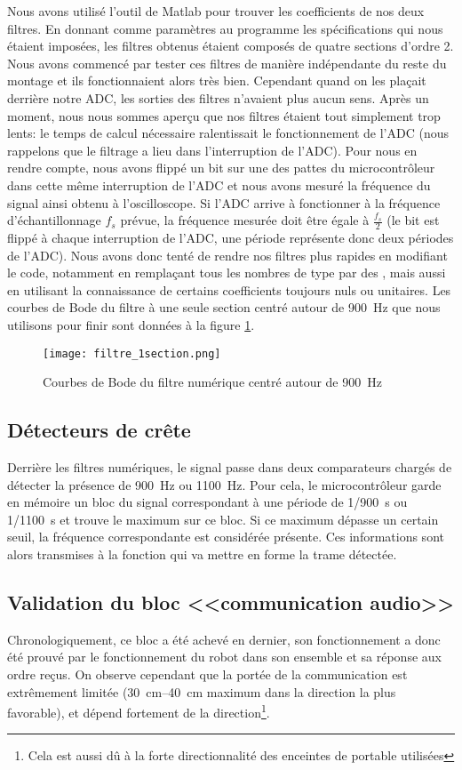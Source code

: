 Nous avons utilisé l'outil  de Matlab pour trouver les coefficients de nos deux filtres. En donnant comme paramètres au programme les spécifications qui nous étaient imposées, les filtres obtenus étaient composés de quatre sections d'ordre 2. Nous avons commencé par tester ces filtres de manière indépendante du reste du montage et ils fonctionnaient alors très bien. Cependant quand on les plaçait derrière notre ADC, les sorties des filtres n'avaient plus aucun sens. Après un moment, nous nous sommes aperçu que nos filtres étaient tout simplement trop lents: le temps de calcul nécessaire ralentissait le fonctionnement de l'ADC (nous rappelons que le filtrage a lieu dans l'interruption de l'ADC). Pour nous en rendre compte, nous avons flippé un bit sur une des pattes du microcontrôleur dans cette même interruption de l'ADC et nous avons mesuré la fréquence du signal ainsi obtenu à l'oscilloscope. Si l'ADC arrive à fonctionner à la fréquence d'échantillonnage $f_s$  prévue, la fréquence mesurée doit être égale à $\frac{f_s}{2}$ (le bit est flippé à chaque interruption de l'ADC, une période représente donc deux périodes de l'ADC). Nous avons donc tenté de rendre nos filtres plus rapides en modifiant le code, notamment en remplaçant tous les nombres de type  par des , mais aussi en utilisant la connaissance de certains coefficients toujours nuls ou unitaires. Les courbes de Bode du filtre à une seule section centré autour de \SI{900}{\hertz} que nous utilisons pour finir sont données à la figure \ref{fig:filtre_1section}.
\begin{figure}[htbp]
\centering
\texttt{[image: filtre\_1section.png]}
\caption{Courbes de Bode du filtre numérique centré autour de \SI{900}{\hertz}}
\label{fig:filtre_1section}
\end{figure}

\subsection{Détecteurs de crête}
Derrière les filtres numériques, le signal passe dans deux comparateurs chargés de détecter la présence de \SI{900}{\hertz} ou \SI{1100}{\hertz}. Pour cela, le microcontrôleur garde en mémoire un bloc du signal correspondant à une période de \SI{1/900}{\second} ou \SI{1/1100}{\second} et trouve le maximum sur ce bloc. Si ce maximum dépasse un certain seuil, la fréquence correspondante est considérée présente. Ces informations sont alors transmises à la fonction  qui va mettre en forme la trame détectée.

\subsection{Validation du bloc <<communication audio>>}
Chronologiquement, ce bloc a été achevé en dernier, son fonctionnement a donc été prouvé par le fonctionnement du robot dans son ensemble et sa réponse aux ordre reçus. On observe cependant que la portée de la communication est extrêmement limitée (\SIrange{30}{40}{\centi\meter} maximum dans la direction la plus favorable), et dépend fortement de la direction\footnote{Cela est aussi dû à la forte directionnalité des enceintes de portable utilisées}.